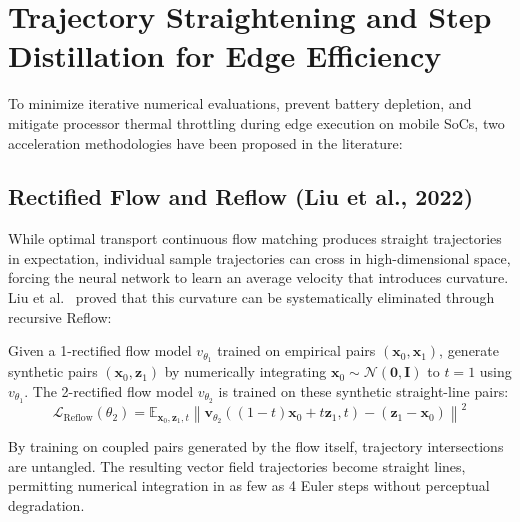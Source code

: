 \section{Trajectory Straightening and Step Distillation for Edge Efficiency}
To minimize iterative numerical evaluations, prevent battery depletion, and mitigate processor thermal throttling during edge execution on mobile SoCs, two acceleration methodologies have been proposed in the literature:

\subsection{Rectified Flow and Reflow (Liu et al., 2022)}
While optimal transport continuous flow matching produces straight trajectories in expectation, individual sample trajectories can cross in high-dimensional space, forcing the neural network to learn an average velocity that introduces curvature. Liu et al.~\cite{liu2022flowstraight} proved that this curvature can be systematically eliminated through recursive Reflow:

\begin{definition}
Given a 1-rectified flow model $v_{\theta_1}$ trained on empirical pairs $(\mathbf{x}_0, \mathbf{x}_1)$, generate synthetic pairs $(\mathbf{x}_0, \mathbf{z}_1)$ by numerically integrating $\mathbf{x}_0 \sim \mathcal{N}(\mathbf{0}, \mathbf{I})$ to $t=1$ using $v_{\theta_1}$. The 2-rectified flow model $v_{\theta_2}$ is trained on these synthetic straight-line pairs:
\begin{equation}
    \mathcal{L}_{\text{Reflow}}(\theta_2) = \mathbb{E}_{\mathbf{x}_0, \mathbf{z}_1, t} \left\| \mathbf{v}_{\theta_2}((1-t)\mathbf{x}_0 + t\mathbf{z}_1, t) - (\mathbf{z}_1 - \mathbf{x}_0) \right\|^2
    \label{eq:reflow_loss}
\end{equation}
\end{definition}
By training on coupled pairs generated by the flow itself, trajectory intersections are untangled. The resulting vector field trajectories become straight lines, permitting numerical integration in as few as 4 Euler steps without perceptual degradation.

